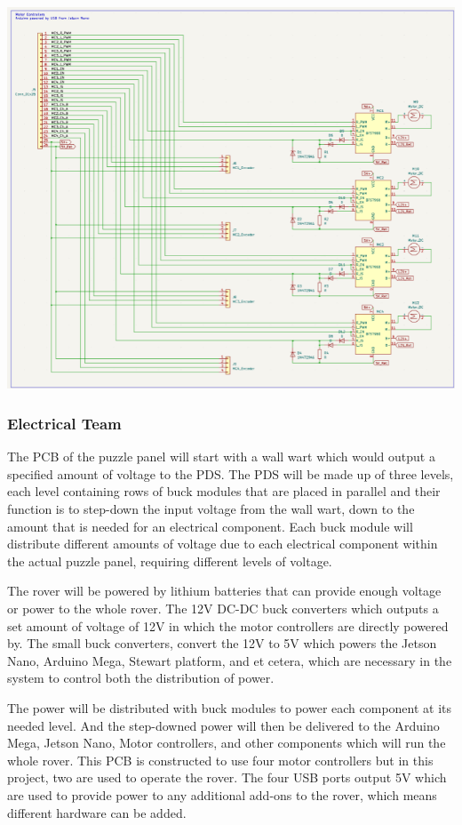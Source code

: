 \documentclass[a4paper, 10pt]{article}
\begin{document}
\includegraphics[scale=0.95]{Rover schematic 2}	

		\subsubsection{Electrical Team}
		The PCB of the puzzle panel will start with a wall wart which would output a specified amount of voltage to the PDS. The PDS will be made up of three levels, each level containing rows of buck modules that are placed in parallel and their function is to step-down the input voltage from the wall wart, down to the amount that is needed for an electrical component. Each buck module will distribute different amounts of voltage due to each electrical component within the actual puzzle panel, requiring different levels of voltage.

		The rover will be powered by lithium batteries that can provide enough voltage or power to the whole rover. The 12V DC-DC buck converters which outputs a set amount of voltage of 12V in which the motor controllers are directly powered by. The small buck converters, convert the 12V to 5V which powers the Jetson Nano, Arduino Mega, Stewart platform, and et cetera, which are necessary in the system to control both the distribution of power. 

		The power will be distributed with buck modules to power each component at its needed level. And the step-downed power will then be delivered to the Arduino Mega, Jetson Nano, Motor controllers, and other components which will run the whole rover. This PCB is constructed to use four motor controllers but in this project, two are used to operate the rover. The four USB ports output 5V which are used to provide power to any additional add-ons to the rover, which means different hardware can be added. 
		
\end{document}
